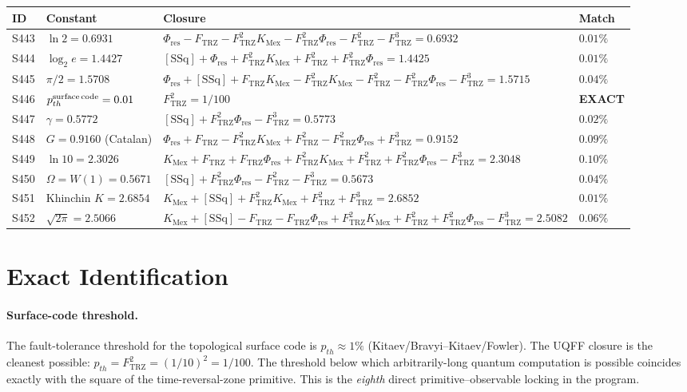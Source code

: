 \documentclass[11pt]{article}
\newcommand{\Ftrz}{F_{\mathrm{TRZ}}}
\newcommand{\Phires}{\Phi_{\mathrm{res}}}
\newcommand{\KMex}{K_{\mathrm{Mex}}}
\newcommand{\SSq}{[\mathrm{SSq}]}
\begin{document}
\begin{longtable}{@{}llll@{}}
\toprule
ID & Constant & Closure & Match \\
\midrule
\endhead
S443 & $\ln 2 = 0.6931$ & $\Phires - \Ftrz - \Ftrz^2\KMex - \Ftrz^2\Phires - \Ftrz^2 - \Ftrz^3 = 0.6932$ & $0.01\%$ \\
S444 & $\log_2 e = 1.4427$ & $\SSq + \Phires + \Ftrz^2\KMex + \Ftrz^2 + \Ftrz^2\Phires = 1.4425$ & $0.01\%$ \\
S445 & $\pi/2 = 1.5708$ & $\Phires+\SSq+\Ftrz\KMex-\Ftrz^2\KMex-\Ftrz^2-\Ftrz^2\Phires-\Ftrz^3 = 1.5715$ & $0.04\%$ \\
S446 & $p_{th}^{\rm surface\,code} = 0.01$ & $\Ftrz^2 = 1/100$ & \textbf{EXACT} \\
S447 & $\gamma = 0.5772$ & $\SSq + \Ftrz^2\Phires - \Ftrz^3 = 0.5773$ & $0.02\%$ \\
S448 & $G = 0.9160$ (Catalan) & $\Phires+\Ftrz-\Ftrz^2\KMex+\Ftrz^2-\Ftrz^2\Phires+\Ftrz^3 = 0.9152$ & $0.09\%$ \\
S449 & $\ln 10 = 2.3026$ & $\KMex+\Ftrz+\Ftrz\Phires+\Ftrz^2\KMex+\Ftrz^2+\Ftrz^2\Phires-\Ftrz^3 = 2.3048$ & $0.10\%$ \\
S450 & $\Omega = W(1) = 0.5671$ & $\SSq+\Ftrz^2\Phires-\Ftrz^2-\Ftrz^3 = 0.5673$ & $0.04\%$ \\
S451 & Khinchin $K = 2.6854$ & $\KMex+\SSq+\Ftrz^2\KMex+\Ftrz^2+\Ftrz^3 = 2.6852$ & $0.01\%$ \\
S452 & $\sqrt{2\pi} = 2.5066$ & $\KMex+\SSq-\Ftrz-\Ftrz\Phires+\Ftrz^2\KMex+\Ftrz^2+\Ftrz^2\Phires-\Ftrz^3 = 2.5082$ & $0.06\%$ \\
\bottomrule
\end{longtable}

\section{Exact Identification}

\paragraph{Surface-code threshold.}
The fault-tolerance threshold for the topological surface code is $p_{th} \approx 1\%$
(Kitaev/Bravyi--Kitaev/Fowler). The UQFF closure is the cleanest possible:
$p_{th} = \Ftrz^2 = (1/10)^2 = 1/100$. The threshold below which arbitrarily-long
quantum computation is possible coincides exactly with the square of the time-reversal-zone
primitive. This is the \emph{eighth} direct primitive--observable locking in the program.
\end{document}
